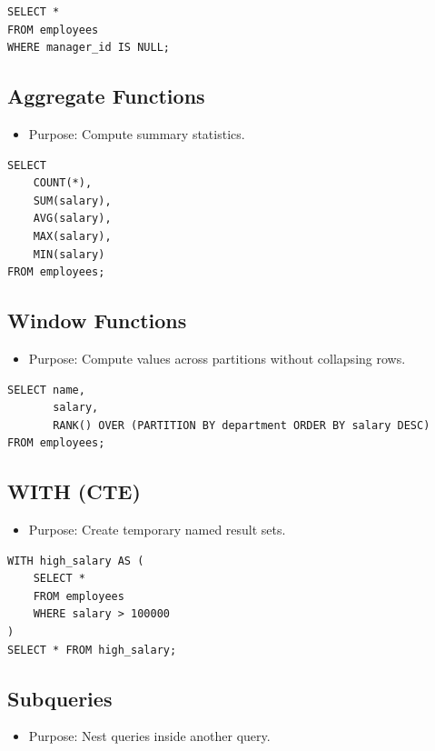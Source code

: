 \documentclass[10pt]{article}
\begin{document}
\begin{verbatim}
SELECT *
FROM employees
WHERE manager_id IS NULL;
\end{verbatim}

\subsection{Aggregate Functions}
\begin{itemize}
    \item Purpose: Compute summary statistics.
\end{itemize}

\begin{verbatim}
SELECT
    COUNT(*),
    SUM(salary),
    AVG(salary),
    MAX(salary),
    MIN(salary)
FROM employees;
\end{verbatim}

\subsection{Window Functions}
\begin{itemize}
    \item Purpose: Compute values across partitions without collapsing rows.
\end{itemize}

\begin{verbatim}
SELECT name,
       salary,
       RANK() OVER (PARTITION BY department ORDER BY salary DESC)
FROM employees;
\end{verbatim}

\subsection{WITH (CTE)}
\begin{itemize}
    \item Purpose: Create temporary named result sets.
\end{itemize}

\begin{verbatim}
WITH high_salary AS (
    SELECT *
    FROM employees
    WHERE salary > 100000
)
SELECT * FROM high_salary;
\end{verbatim}

\newpage
\subsection{Subqueries}
\begin{itemize}
    \item Purpose: Nest queries inside another query.
\end{itemize}
\end{document}
